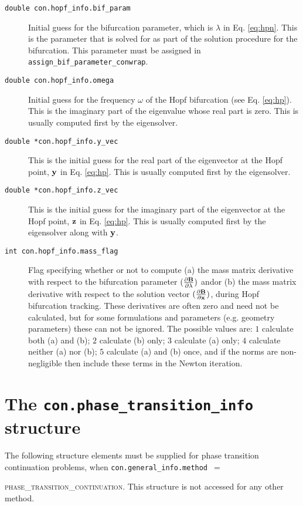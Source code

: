 {{{{\begin{description}
\item[\texttt{double con.hopf\_info.bif\_param}] Initial guess for the bifurcation parameter, which is $\lambda$ in Eq. \ref{eq:hpn}. This is the parameter that is solved for as part of the solution procedure for the bifurcation. This parameter must be assigned in \texttt{assign\_bif\_parameter\_conwrap}.
\item[\texttt{double con.hopf\_info.omega}] Initial guess for the frequency $\omega$ of the Hopf bifurcation (see Eq. \ref{eq:hp}). This is the imaginary part of the eigenvalue whose real part is zero. This is usually computed first by the eigensolver.
\item[\texttt{double *con.hopf\_info.y\_vec}] This is the initial guess for the real part of the eigenvector at the Hopf point, ${\bf y}$ in Eq. \ref{eq:hp}. This is usually computed first by the eigensolver.
\item[\texttt{double *con.hopf\_info.z\_vec}] This is the initial guess for the imaginary part of the eigenvector at the Hopf point, ${\bf z}$ in Eq. \ref{eq:hp}. This is usually computed first by the eigensolver along with ${\bf y}$.
\item[\texttt{int con.hopf\_info.mass\_flag}] Flag specifying whether or not to compute (a) the mass matrix derivative with respect to the bifurcation parameter $(\frac{\partial {\bf B}}{\partial \lambda})$ and\/or (b) the mass matrix derivative with respect to the solution vector $(\frac{\partial {\bf B}}{\partial {\bf x}})$, during Hopf bifurcation tracking. These derivatives are often zero and need not be calculated, but for some formulations and parameters (e.g. geometry parameters) these can not be ignored. The possible values are: $1$ calculate both (a) and (b); $2$ calculate (b) only; $3$ calculate (a) only; $4$ calculate neither (a) nor (b); $5$ calculate (a) and (b) once, and if the norms are non-negligible then include these terms in the Newton iteration.

\end{description}

\section{The \texttt{con.phase\_transition\_info} structure}

The following structure elements must be supplied for phase transition continuation problems, when \texttt{con.general\_info.method $=$}{\textsc{phase\_transition\_continuation}. This structure is not accessed for any other method.

}}}}}
